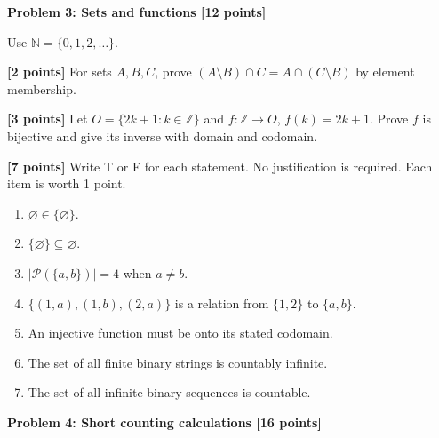 \documentclass[12pt,letterpaper]{article}
\newcommand{\problemheading}[2][5\baselineskip]{\Needspace{#1}\par\noindent\hspace*{-0.625in}\textbf{#2}\par\nobreak\vspace{0.3em}}
\newcommand{\examspace}[1]{\par\vspace*{#1cm}}
\begin{document}
\clearpage
\vspace*{0.21in}
\problemheading{Problem 3: Sets and functions [12 points]}
\begin{list}{}{\setlength{\leftmargin}{0.25in}\setlength{\rightmargin}{0.25in}}\item[]
Use $\mathbb N=\{0,1,2,\ldots\}$.
\begin{description}[font=\normalfont,leftmargin=1.2em,labelsep=0.4em]
\item[(a)] \textbf{[2 points]} For sets $A,B,C$, prove $(A\setminus B)\cap C=A\cap(C\setminus B)$ by element membership.
\examspace{3}
\Needspace{\dimexpr 4cm+4\baselineskip\relax}
\item[(b)] \textbf{[3 points]} Let $O=\{2k+1:k\in\mathbb Z\}$ and $f:\mathbb Z\to O$, $f(k)=2k+1$. Prove $f$ is bijective and give its inverse with domain and codomain.
\examspace{4}
\Needspace{\dimexpr 1cm+4\baselineskip\relax}
\item[(c)] \textbf{[7 points]} Write T or F for each statement. No justification is required. Each item is worth 1 point.\begin{enumerate}[label=(\roman*)]\item $\varnothing\in\{\varnothing\}$.\item $\{\varnothing\}\subseteq\varnothing$.\item $|\mathcal P(\{a,b\})|=4$ when $a\ne b$.\item $\{(1,a),(1,b),(2,a)\}$ is a relation from $\{1,2\}$ to $\{a,b\}$.\item An injective function must be onto its stated codomain.\item The set of all finite binary strings is countably infinite.\item The set of all infinite binary sequences is countable.\end{enumerate}
\examspace{1}
\end{description}
\end{list}
\clearpage
\vspace*{0.21in}
\problemheading{Problem 4: Short counting calculations [16 points]}
\end{document}
